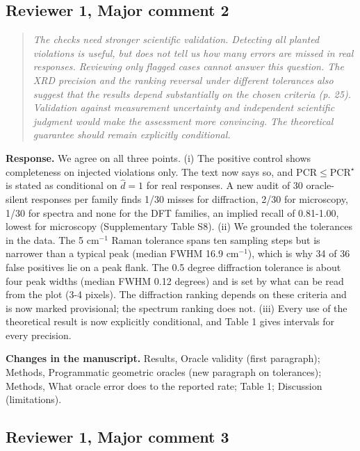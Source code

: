 \documentclass[11pt,a4paper]{article}
\newenvironment{reviewer}{\begin{quote}\itshape\small}{\end{quote}}
\begin{document}
\subsection*{Reviewer 1, Major comment 2}

\begin{reviewer}The checks need stronger scientific validation. Detecting all planted violations is useful, but does not tell us how many errors are missed in real responses. Reviewing only flagged cases cannot answer this question. The XRD precision and the ranking reversal under different tolerances also suggest that the results depend substantially on the chosen criteria (p. 25). Validation against measurement uncertainty and independent scientific judgment would make the assessment more convincing. The theoretical guarantee should remain explicitly conditional.\end{reviewer}

\textbf{Response.} We agree on all three points. (i) The positive control shows completeness on injected violations only. The text now says so, and $\mathrm{PCR}\le\mathrm{PCR}^\star$ is stated as conditional on $\hat d=1$ for real responses. A new audit of 30 oracle-silent responses per family finds 1/30 misses for diffraction, 2/30 for microscopy, 1/30 for spectra and none for the DFT families, an implied recall of 0.81-1.00, lowest for microscopy (Supplementary Table S8). (ii) We grounded the tolerances in the data. The 5 cm$^{-1}$ Raman tolerance spans ten sampling steps but is narrower than a typical peak (median FWHM 16.9 cm$^{-1}$), which is why 34 of 36 false positives lie on a peak flank. The 0.5 degree diffraction tolerance is about four peak widths (median FWHM 0.12 degrees) and is set by what can be read from the plot (3-4 pixels). The diffraction ranking depends on these criteria and is now marked provisional; the spectrum ranking does not. (iii) Every use of the theoretical result is now explicitly conditional, and Table 1 gives intervals for every precision.

\textbf{Changes in the manuscript.} Results, Oracle validity (first paragraph); Methods, Programmatic geometric oracles (new paragraph on tolerances); Methods, What oracle error does to the reported rate; Table 1; Discussion (limitations).

\subsection*{Reviewer 1, Major comment 3}
\end{document}
